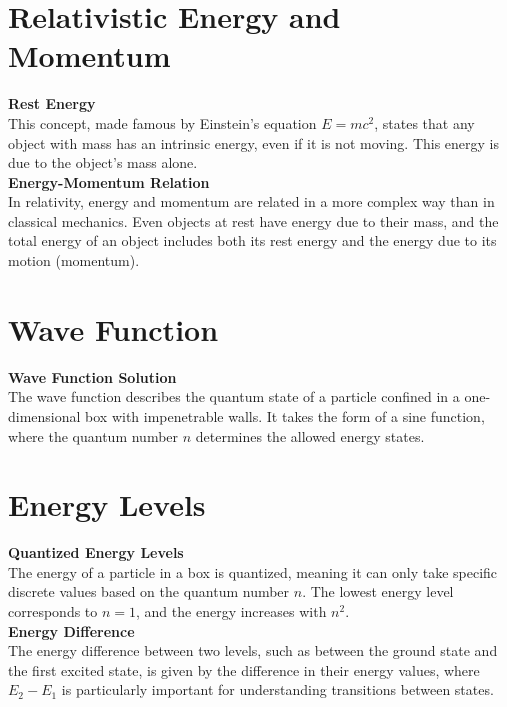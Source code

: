 \documentclass[a4paper,12pt]{article}
\begin{document}
\begin{footnotesize}
\begin{multicols}{3}
\section*{Relativistic Energy and Momentum}

\textbf{Rest Energy} \\
This concept, made famous by Einstein’s equation \( E = mc^2 \), states that any object with mass has an intrinsic energy, even if it is not moving. This energy is due to the object’s mass alone. \\


\textbf{Energy-Momentum Relation} \\
In relativity, energy and momentum are related in a more complex way than in classical mechanics. Even objects at rest have energy due to their mass, and the total energy of an object includes both its rest energy and the energy due to its motion (momentum). \\

\section*{Wave Function}

\textbf{Wave Function Solution} \\
The wave function describes the quantum state of a particle confined in a one-dimensional box with impenetrable walls. It takes the form of a sine function, where the quantum number \(n\) determines the allowed energy states. \\

\section*{Energy Levels}

\textbf{Quantized Energy Levels} \\
The energy of a particle in a box is quantized, meaning it can only take specific discrete values based on the quantum number \(n\). The lowest energy level corresponds to \(n=1\), and the energy increases with \(n^2\). \\

\textbf{Energy Difference} \\
The energy difference between two levels, such as between the ground state and the first excited state, is given by the difference in their energy values, where \(E_2 - E_1\) is particularly important for understanding transitions between states. \\


\end{multicols}
\end{footnotesize}
\end{document}
